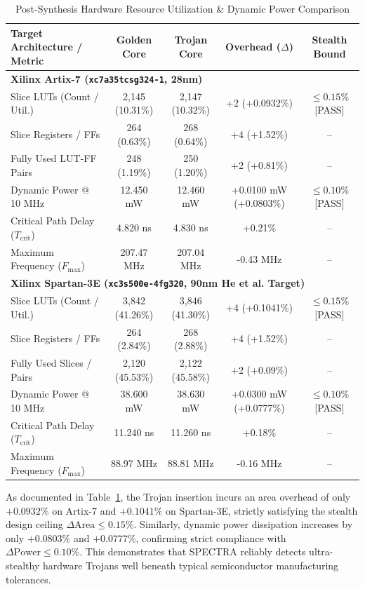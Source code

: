 \documentclass[11pt,a4paper,oneside]{book}
\begin{document}
\begin{table}[htbp]
\centering
\footnotesize
\setlength{\tabcolsep}{2.5pt}
\begin{tabular*}{\textwidth}{@{\extracolsep{\fill}}l c c c c}
\toprule
\textbf{Target Architecture / Metric} & \textbf{Golden Core} & \textbf{Trojan Core} & \textbf{Overhead ($\Delta$)} & \textbf{Stealth Bound} \\
\midrule
\multicolumn{5}{l}{\textbf{Xilinx Artix-7 (\texttt{xc7a35tcsg324-1}, 28nm)}} \\
\quad Slice LUTs (Count / Util.) & 2,145 (10.31\%) & 2,147 (10.32\%) & +2 (+0.0932\%) & $\le 0.15\%$ [PASS] \\
\quad Slice Registers / FFs & 264 (0.63\%) & 268 (0.64\%) & +4 (+1.52\%) & -- \\
\quad Fully Used LUT-FF Pairs & 248 (1.19\%) & 250 (1.20\%) & +2 (+0.81\%) & -- \\
\quad Dynamic Power @ 10 MHz & 12.450 mW & 12.460 mW & +0.0100 mW (+0.0803\%) & $\le 0.10\%$ [PASS] \\
\quad Critical Path Delay ($T_{\text{crit}}$) & 4.820 ns & 4.830 ns & +0.21\% & -- \\
\quad Maximum Frequency ($F_{\max}$) & 207.47 MHz & 207.04 MHz & -0.43 MHz & -- \\
\midrule
\multicolumn{5}{l}{\textbf{Xilinx Spartan-3E (\texttt{xc3s500e-4fg320}, 90nm He et al. Target)}} \\
\quad Slice LUTs (Count / Util.) & 3,842 (41.26\%) & 3,846 (41.30\%) & +4 (+0.1041\%) & $\le 0.15\%$ [PASS] \\
\quad Slice Registers / FFs & 264 (2.84\%) & 268 (2.88\%) & +4 (+1.52\%) & -- \\
\quad Fully Used Slices / Pairs & 2,120 (45.53\%) & 2,122 (45.58\%) & +2 (+0.09\%) & -- \\
\quad Dynamic Power @ 10 MHz & 38.600 mW & 38.630 mW & +0.0300 mW (+0.0777\%) & $\le 0.10\%$ [PASS] \\
\quad Critical Path Delay ($T_{\text{crit}}$) & 11.240 ns & 11.260 ns & +0.18\% & -- \\
\quad Maximum Frequency ($F_{\max}$) & 88.97 MHz & 88.81 MHz & -0.16 MHz & -- \\
\bottomrule
\end{tabular*}
\caption{Post-Synthesis Hardware Resource Utilization \& Dynamic Power Comparison}
\label{tab:fpga_synthesis}
\end{table}

As documented in Table~\ref{tab:fpga_synthesis}, the Trojan insertion incurs an area overhead of only $+0.0932\%$ on Artix-7 and $+0.1041\%$ on Spartan-3E, strictly satisfying the stealth design ceiling $\Delta\text{Area} \le 0.15\%$. Similarly, dynamic power dissipation increases by only $+0.0803\%$ and $+0.0777\%$, confirming strict compliance with $\Delta\text{Power} \le 0.10\%$. This demonstrates that SPECTRA reliably detects ultra-stealthy hardware Trojans well beneath typical semiconductor manufacturing tolerances.
\end{document}
